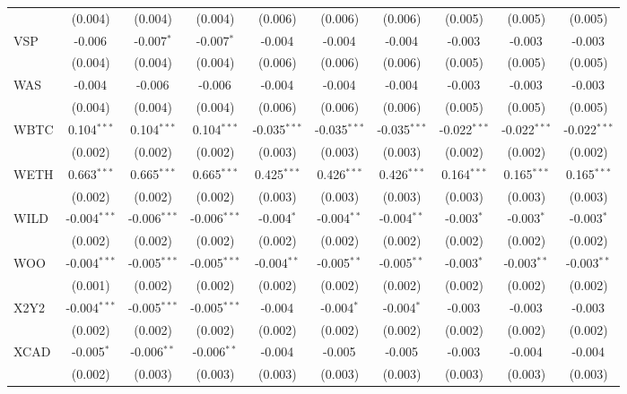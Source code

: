 \begin{table}[!htbp]
\begin{tabular}{@{\extracolsep{5pt}}lccccccccc}
  & (0.004) & (0.004) & (0.004) & (0.006) & (0.006) & (0.006) & (0.005) & (0.005) & (0.005) \\
 VSP & -0.006$^{}$ & -0.007$^{*}$ & -0.007$^{*}$ & -0.004$^{}$ & -0.004$^{}$ & -0.004$^{}$ & -0.003$^{}$ & -0.003$^{}$ & -0.003$^{}$ \\
  & (0.004) & (0.004) & (0.004) & (0.006) & (0.006) & (0.006) & (0.005) & (0.005) & (0.005) \\
 WAS & -0.004$^{}$ & -0.006$^{}$ & -0.006$^{}$ & -0.004$^{}$ & -0.004$^{}$ & -0.004$^{}$ & -0.003$^{}$ & -0.003$^{}$ & -0.003$^{}$ \\
  & (0.004) & (0.004) & (0.004) & (0.006) & (0.006) & (0.006) & (0.005) & (0.005) & (0.005) \\
 WBTC & 0.104$^{***}$ & 0.104$^{***}$ & 0.104$^{***}$ & -0.035$^{***}$ & -0.035$^{***}$ & -0.035$^{***}$ & -0.022$^{***}$ & -0.022$^{***}$ & -0.022$^{***}$ \\
  & (0.002) & (0.002) & (0.002) & (0.003) & (0.003) & (0.003) & (0.002) & (0.002) & (0.002) \\
 WETH & 0.663$^{***}$ & 0.665$^{***}$ & 0.665$^{***}$ & 0.425$^{***}$ & 0.426$^{***}$ & 0.426$^{***}$ & 0.164$^{***}$ & 0.165$^{***}$ & 0.165$^{***}$ \\
  & (0.002) & (0.002) & (0.002) & (0.003) & (0.003) & (0.003) & (0.003) & (0.003) & (0.003) \\
 WILD & -0.004$^{***}$ & -0.006$^{***}$ & -0.006$^{***}$ & -0.004$^{*}$ & -0.004$^{**}$ & -0.004$^{**}$ & -0.003$^{*}$ & -0.003$^{*}$ & -0.003$^{*}$ \\
  & (0.002) & (0.002) & (0.002) & (0.002) & (0.002) & (0.002) & (0.002) & (0.002) & (0.002) \\
 WOO & -0.004$^{***}$ & -0.005$^{***}$ & -0.005$^{***}$ & -0.004$^{**}$ & -0.005$^{**}$ & -0.005$^{**}$ & -0.003$^{*}$ & -0.003$^{**}$ & -0.003$^{**}$ \\
  & (0.001) & (0.002) & (0.002) & (0.002) & (0.002) & (0.002) & (0.002) & (0.002) & (0.002) \\
 X2Y2 & -0.004$^{***}$ & -0.005$^{***}$ & -0.005$^{***}$ & -0.004$^{}$ & -0.004$^{*}$ & -0.004$^{*}$ & -0.003$^{}$ & -0.003$^{}$ & -0.003$^{}$ \\
  & (0.002) & (0.002) & (0.002) & (0.002) & (0.002) & (0.002) & (0.002) & (0.002) & (0.002) \\
 XCAD & -0.005$^{*}$ & -0.006$^{**}$ & -0.006$^{**}$ & -0.004$^{}$ & -0.005$^{}$ & -0.005$^{}$ & -0.003$^{}$ & -0.004$^{}$ & -0.004$^{}$ \\
  & (0.002) & (0.003) & (0.003) & (0.003) & (0.003) & (0.003) & (0.003) & (0.003) & (0.003) \\

\end{tabular}
\end{table}
